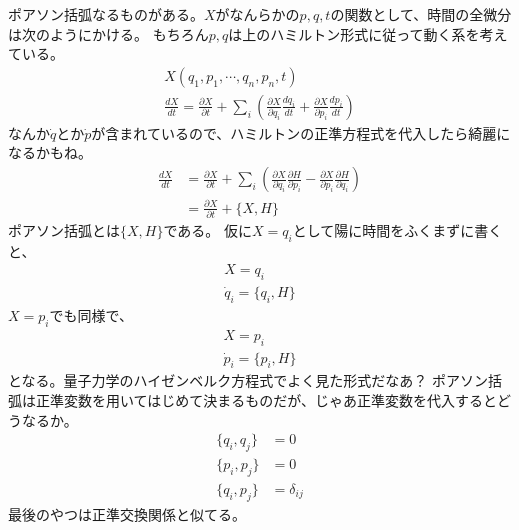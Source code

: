 \documentclass{jsarticle}
\begin{document}
\newpage
ポアソン括弧なるものがある。$X$がなんらかの$p,q,t$の関数として、時間の全微分は次のようにかける。
もちろん$p,q$は上のハミルトン形式に従って動く系を考えている。
\begin{gather*}
  X(q_1,p_1,\cdots, q_n,p_n, t)\\
  \frac{d X}{d t} = \frac{\partial X}{\partial t}+\sum_{i} \left( \frac{\partial X}{\partial q_i}\frac{d q_i}{d t} + \frac{\partial X}{\partial p_i}\frac{d p_i}{d t} \right)
\end{gather*}
なんか$\dot{q}$とか$\dot{p}$が含まれているので、ハミルトンの正準方程式を代入したら綺麗になるかもね。
\begin{align*}
  \frac{d X}{d t} & = \frac{\partial X}{\partial t}+\sum_{i} \left( \frac{\partial X}{\partial q_i}\frac{\partial H}{\partial p_i} - \frac{\partial X}{\partial p_i}\frac{\partial H}{\partial q_i} \right)\\
& = \frac{\partial X}{\partial t} +  \{  X, H \}
\end{align*}
ポアソン括弧とは$\{  X, H \}$である。
仮に$X = q_i$として陽に時間をふくまずに書くと、
\begin{align*}
  X = q_i\\
  \dot{q}_i = \{ q_i, H \}
\end{align*}
$X = p_i$でも同様で、
\begin{align*}
  X = p_i\\
  \dot{p}_i = \{ p_i, H \}
\end{align*}
となる。量子力学のハイゼンベルク方程式でよく見た形式だなあ？
ポアソン括弧は正準変数を用いてはじめて決まるものだが、じゃあ正準変数を代入するとどうなるか。
\begin{align*}
  \{q_i, q_j\} &= 0 \\
  \{p_i, p_j\} &= 0 \\
  \{q_i, p_j\} &= \delta_{ij} 
\end{align*}
最後のやつは正準交換関係と似てる。
\end{document}
